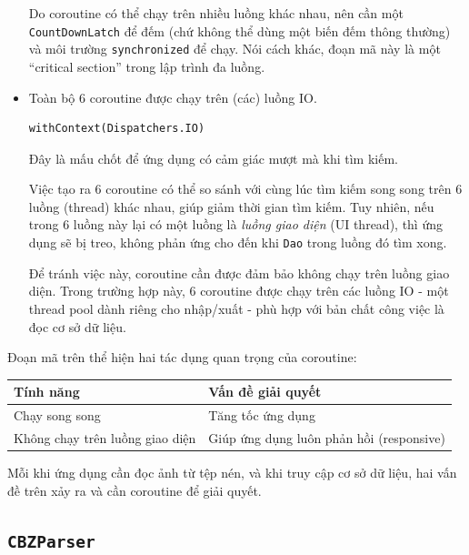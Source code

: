 \documentclass[../../thesis]{subfiles}
\begin{document}
\begin{itemize}
        Do coroutine có thể chạy trên nhiều luồng khác nhau, nên cần một
        \texttt{CountDownLatch} để đếm (chứ không thể dùng một biến đếm thông
        thường) và môi trường \texttt{synchronized} để chạy. Nói cách khác, đoạn
        mã này là một ``critical section'' trong lập trình đa luồng.
    \item
        Toàn bộ 6 coroutine được chạy trên (các) luồng IO.

        \begin{verbatim}
withContext(Dispatchers.IO)
        \end{verbatim}

        Đây là mấu chốt để ứng dụng có cảm giác mượt mà khi tìm kiếm.

        Việc tạo ra 6 coroutine có thể so sánh với cùng lúc tìm kiếm song song
        trên 6 luồng (thread) khác nhau, giúp giảm thời gian tìm kiếm. Tuy
        nhiên, nếu trong 6 luồng này lại có một luồng là \emph{luồng giao diện}
        (UI thread), thì ứng dụng sẽ bị treo, không phản ứng cho đến khi
        \texttt{Dao} trong luồng đó tìm xong.

        Để tránh việc này, coroutine cần được đảm bảo không chạy trên luồng giao
        diện. Trong trường hợp này, 6 coroutine được chạy trên các luồng IO -
        một thread pool dành riêng cho nhập/xuất - phù hợp với bản chất công
        việc là đọc cơ sở dữ liệu.
\end{itemize}

Đoạn mã trên thể hiện hai tác dụng quan trọng của coroutine:

\begin{table}[H]
    \centering
    \begin{tabular}{l l}
        \toprule
        Tính năng      & Vấn đề giải quyết \\
        \midrule
        Chạy song song & Tăng tốc ứng dụng \\
        Không chạy trên luồng giao diện & Giúp ứng dụng luôn phản hồi (responsive) \\
        \bottomrule
    \end{tabular}
\end{table}

Mỗi khi ứng dụng cần đọc ảnh từ tệp nén, và khi truy cập cơ sở dữ liệu,
hai vấn đề trên xảy ra và cần coroutine để giải quyết.

\subsection{\texttt{CBZParser}}\label{sec:cbzparser}
\end{document}
